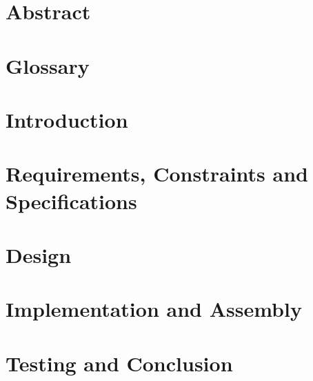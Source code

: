 \documentclass[12pt, a4paper]{article}
\begin{document}
	
	
	\setcounter{page}{0}
	\newpage
	
	\section*{Abstract}
	
	\pagebreak
	
	\tableofcontents
	\pagebreak
	
	\listoffigures
	\pagebreak
	\listoftables
	\pagebreak
	\section*{Glossary}
	
	\pagebreak
	
	\section{Introduction}
	\label{sec:intro}
	
	\pagebreak
	
	\section{Requirements, Constraints and Specifications}
	\label{sec:requirements}
	
	\pagebreak
	
	\section{Design}
	\label{sec:design}
	
	\pagebreak
	
 	\section{Implementation and Assembly}
 	\label{sec:implementation}
	
	\pagebreak
	
	\section{Testing and Conclusion}
	\label{sec:calibration}
	
	\pagebreak
	
	\printbibliography
	\pagebreak
	
	\appendix
	

	
\end{document}
